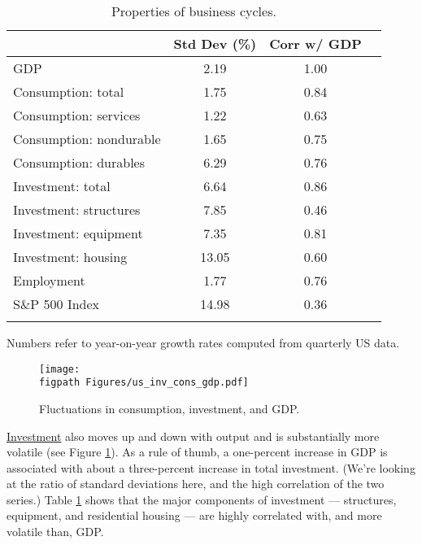 \begin{table}[h!]
\centering
\caption{Properties of business cycles.}
\label{tab:cycleprops}
\begin{tabular*}{0.8\textwidth}{l@{\extracolsep{\fill}}ccc}
\toprule
        &  Std Dev (\%)  &  Corr w/ GDP  \\
\midrule
GDP     &      2.19          &    1.00      \\
Consumption:  total      &  1.75  &  0.84   \\
Consumption:  services   &  1.22  &  0.63   \\
Consumption:  nondurable &  1.65  &  0.75   \\
Consumption:  durables   &  6.29  &  0.76   \\
Investment:  total       &  6.64  &  0.86   \\
Investment:  structures  &  7.85  &  0.46   \\
Investment:  equipment   &  7.35  &  0.81   \\
Investment:  housing     &  13.05\phantom{1} &  0.60   \\
Employment               &  1.77  &  0.76   \\
S\&P 500 Index           &  14.98\phantom{1}  &  0.36   \\
\bottomrule
\addlinespace
\end{tabular*}
\begin{minipage}{0.8\textwidth}
\footnotesize{Numbers refer to year-on-year growth rates computed from quarterly US data.}
\end{minipage}
\end{table}

\begin{figure}[h!]
    \caption{Fluctuations in consumption, investment, and GDP.}
    \label{fig:gcall}%
    \centering
    \texttt{[image: \\figpath Figures/us\_inv\_cons\_gdp.pdf]}
\end{figure}

\href{http://research.stlouisfed.org/fred2/series/GPDIC96?cid=112}{Investment}
also moves up and down with output
and is substantially more volatile (see Figure \ref{fig:gcall}).
As a rule of thumb, a one-percent increase in GDP is associated with
about a three-percent increase in total investment.
(We're looking at the ratio of standard deviations here,
and the high correlation of the two series.)
Table \ref{tab:cycleprops}
shows that the major components of investment --- structures, equipment,
and residential housing --- are highly correlated with,
and more volatile than, GDP.


